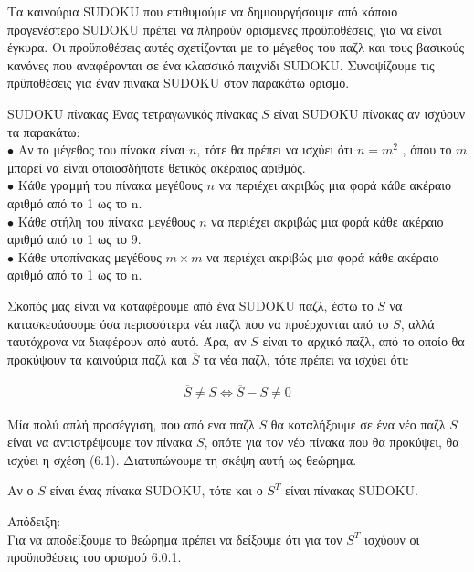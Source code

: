 \documentclass[12pt]{book}
\theoremstyle{definition}
\begin{document}
Τα καινούρια SUDOKU που επιθυμούμε να δημιουργήσουμε από κάποιο προγενέστερο SUDOKU πρέπει να πληρούν ορισμένες προϋποθέσεις, για να είναι έγκυρα. Οι προϋποθέσεις αυτές σχετίζονται με το μέγεθος του παζλ και τους βασικούς κανόνες που αναφέρονται σε ένα κλασσικό παιχνίδι SUDOKU. Συνοψίζουμε τις πρϋποθέσεις για έναν πίνακα SUDOKU στον παρακάτω ορισμό. \par

\begin{mytheorem}{SUDOKU πίνακας}{}
	Ένας τετραγωνικός πίνακας \(S\) είναι SUDOKU πίνακας αν ισχύουν τα παρακάτω: \\
	\(\bullet\) Αν το μέγεθος του πίνακα είναι \(n\), τότε θα πρέπει να ισχύει ότι \(n = m^{2}\) , όπου το \(m\) μπορεί να είναι οποιοσδήποτε θετικός ακέραιος αριθμός. \\
	\(\bullet\) Κάθε γραμμή του πίνακα μεγέθους \(n\) να περιέχει ακριβώς μια φορά κάθε ακέραιο αριθμό από το 1 ως το n. \\
	\(\bullet\) Κάθε στήλη του πίνακα μεγέθους \(n\) να περιέχει ακριβώς μια φορά κάθε ακέραιο αριθμό από το 1 ως το 9. \\
	\(\bullet\) Κάθε υποπίνακας μεγέθους \(m \times m\) να περιέχει ακριβώς μια φορά κάθε ακέραιο αριθμό από το 1 ως το n. \\
\end{mytheorem}

Σκοπός μας είναι να καταφέρουμε από ένα SUDOKU παζλ, έστω το \(S\) να κατασκευάσουμε όσα περισσότερα νέα παζλ που να προέρχονται από το \(S\), αλλά ταυτόχρονα να διαφέρουν από αυτό. Άρα, αν \(S\) είναι το αρχικό παζλ, από το οποίο θα προκύψουν τα καινούρια παζλ και \(\overline{S}\) τα νέα παζλ, τότε πρέπει να ισχύει ότι:

\begin{align}
	\overline{S} \neq S \Leftrightarrow
	\overline{S} - S \neq 0
\end{align}

Μία πολύ απλή προσέγγιση, που από ενα παζλ \(S\) θα καταλήξουμε σε ένα νέο παζλ \(\overline{S}\) είναι να αντιστρέψουμε τον πίνακα \(S\), οπότε για τον νέο πίνακα που θα προκύψει, θα ισχύει η σχέση (6.1). Διατυπώνουμε τη σκέψη αυτή ως θεώρημα. \par

\begin{theorem}{}{}
	Αν ο \(S\) είναι ένας πίνακα SUDOKU, τότε και ο \(S^{T}\) είναι πίνακας SUDOKU.
\end{theorem}

Απόδειξη: \\
Για να αποδείξουμε το θεώρημα πρέπει να δείξουμε ότι για τον \(S^{T}\) ισχύουν οι προϋποθέσεις του ορισμού 6.0.1. \\ \\
\end{document}
